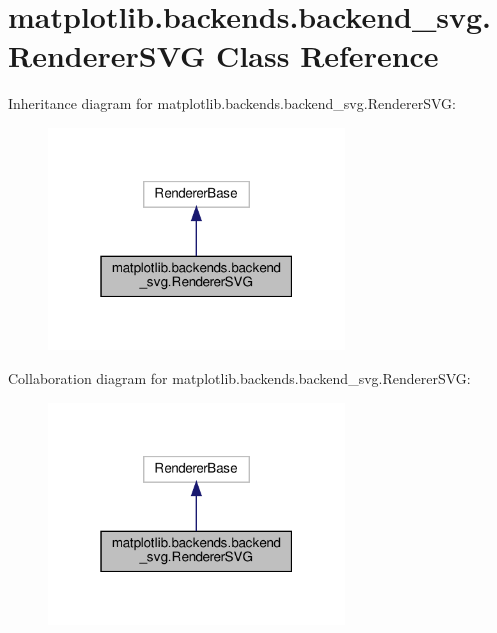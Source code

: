 \hypertarget{classmatplotlib_1_1backends_1_1backend__svg_1_1RendererSVG}{}\section{matplotlib.\+backends.\+backend\+\_\+svg.\+Renderer\+S\+VG Class Reference}
\label{classmatplotlib_1_1backends_1_1backend__svg_1_1RendererSVG}


Inheritance diagram for matplotlib.\+backends.\+backend\+\_\+svg.\+Renderer\+S\+VG\+:
\nopagebreak
\begin{figure}[H]
\begin{center}
\leavevmode
\includegraphics[width=223pt]{classmatplotlib_1_1backends_1_1backend__svg_1_1RendererSVG__inherit__graph}
\end{center}
\end{figure}


Collaboration diagram for matplotlib.\+backends.\+backend\+\_\+svg.\+Renderer\+S\+VG\+:
\nopagebreak
\begin{figure}[H]
\begin{center}
\leavevmode
\includegraphics[width=223pt]{classmatplotlib_1_1backends_1_1backend__svg_1_1RendererSVG__coll__graph}
\end{center}
\end{figure}
